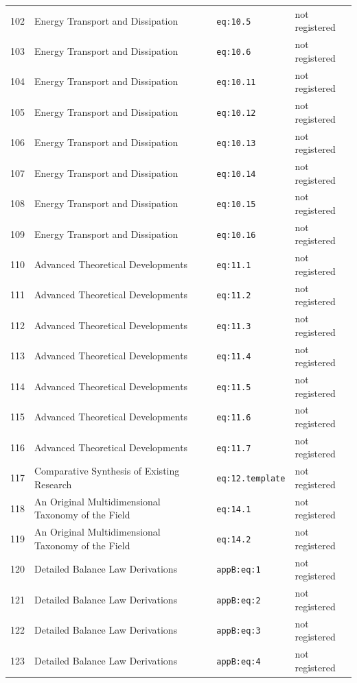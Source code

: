 \begin{longtable}{@{}p{1.1cm}p{5.6cm}p{3.4cm}p{2.9cm}@{}}
102 & Energy Transport and Dissipation & \texttt{eq:10.5} & not registered \\
103 & Energy Transport and Dissipation & \texttt{eq:10.6} & not registered \\
104 & Energy Transport and Dissipation & \texttt{eq:10.11} & not registered \\
105 & Energy Transport and Dissipation & \texttt{eq:10.12} & not registered \\
106 & Energy Transport and Dissipation & \texttt{eq:10.13} & not registered \\
107 & Energy Transport and Dissipation & \texttt{eq:10.14} & not registered \\
108 & Energy Transport and Dissipation & \texttt{eq:10.15} & not registered \\
109 & Energy Transport and Dissipation & \texttt{eq:10.16} & not registered \\
110 & Advanced Theoretical Developments & \texttt{eq:11.1} & not registered \\
111 & Advanced Theoretical Developments & \texttt{eq:11.2} & not registered \\
112 & Advanced Theoretical Developments & \texttt{eq:11.3} & not registered \\
113 & Advanced Theoretical Developments & \texttt{eq:11.4} & not registered \\
114 & Advanced Theoretical Developments & \texttt{eq:11.5} & not registered \\
115 & Advanced Theoretical Developments & \texttt{eq:11.6} & not registered \\
116 & Advanced Theoretical Developments & \texttt{eq:11.7} & not registered \\
117 & Comparative Synthesis of Existing Research & \texttt{eq:12.template} & not registered \\
118 & An Original Multidimensional Taxonomy of the Field & \texttt{eq:14.1} & not registered \\
119 & An Original Multidimensional Taxonomy of the Field & \texttt{eq:14.2} & not registered \\
120 & Detailed Balance Law Derivations & \texttt{appB:eq:1} & not registered \\
121 & Detailed Balance Law Derivations & \texttt{appB:eq:2} & not registered \\
122 & Detailed Balance Law Derivations & \texttt{appB:eq:3} & not registered \\
123 & Detailed Balance Law Derivations & \texttt{appB:eq:4} & not registered \\

\end{longtable}
